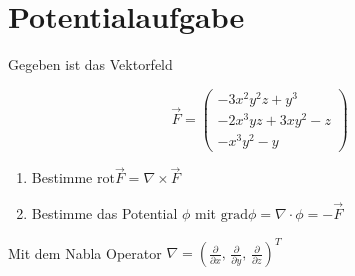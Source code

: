 \section{Potentialaufgabe}
Gegeben ist das Vektorfeld

\begin{equation*}
\vec{F}=\begin{pmatrix} -3x^2y^2z+y^3 \\ -2x^3yz+3xy^2-z \\ -x^3y^2-y\end{pmatrix}
\end{equation*}

\begin{enumerate}[label=\roman*]
\item {Bestimme $\mathup{rot}\vec{F}=\nabla \times \vec{F}$}
\item {Bestimme das Potential $\phi$ mit $\mathup{grad}\phi=\nabla \cdot \phi=-\vec{F}$}
\end{enumerate}
Mit dem Nabla Operator $\nabla = \left( \frac{\partial}{\partial x},\, \frac{\partial}{\partial y},\, \frac{\partial}{\partial z}\right) ^T $
\newpage
